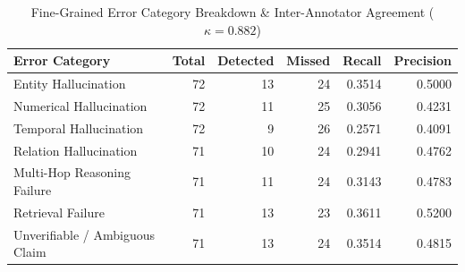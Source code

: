 \begin{table}[htbp]
\caption{Fine-Grained Error Category Breakdown & Inter-Annotator Agreement ($\kappa = 0.882$)}
\begin{center}
\begin{tabular}{lrrrrr}
\toprule
\textbf{Error Category} & \textbf{Total} & \textbf{Detected} & \textbf{Missed} & \textbf{Recall} & \textbf{Precision} \\
\midrule
Entity Hallucination & 72 & 13 & 24 & 0.3514 & 0.5000 \\
Numerical Hallucination & 72 & 11 & 25 & 0.3056 & 0.4231 \\
Temporal Hallucination & 72 & 9 & 26 & 0.2571 & 0.4091 \\
Relation Hallucination & 71 & 10 & 24 & 0.2941 & 0.4762 \\
Multi-Hop Reasoning Failure & 71 & 11 & 24 & 0.3143 & 0.4783 \\
Retrieval Failure & 71 & 13 & 23 & 0.3611 & 0.5200 \\
Unverifiable / Ambiguous Claim & 71 & 13 & 24 & 0.3514 & 0.4815 \\
\bottomrule
\end{tabular}
\label{tab:error_breakdown}
\end{center}
\end{table}